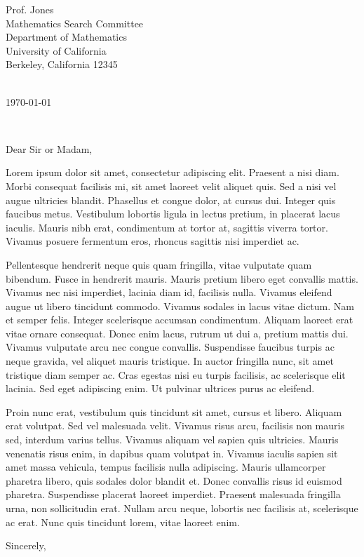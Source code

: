 \documentclass[11pt,a4paper]{letter} %
\def\opening#1{\thispagestyle{empty}
{\centering\fromaddress \vspace{0.6in} \\ %
\hspace*{\longindentation}\today\hspace*{\fill}\par} %
{\raggedright \toname \\ \toaddress \par} %
\vspace{0.4in} %
\noindent #1 %
}
\begin{document}

\begin{letter}
{Prof. Jones\\
Mathematics Search Committee\\
Department of Mathematics\\
University of California\\
Berkeley, California 12345\\
}


\opening{Dear Sir or Madam,}

Lorem ipsum dolor sit amet, consectetur adipiscing elit. Praesent a nisi diam. Morbi consequat facilisis mi, sit amet laoreet velit aliquet quis. Sed a nisi vel augue ultricies blandit. Phasellus et congue dolor, at cursus dui. Integer quis faucibus metus. Vestibulum lobortis ligula in lectus pretium, in placerat lacus iaculis. Mauris nibh erat, condimentum at tortor at, sagittis viverra tortor. Vivamus posuere fermentum eros, rhoncus sagittis nisi imperdiet ac.

Pellentesque hendrerit neque quis quam fringilla, vitae vulputate quam bibendum. Fusce in hendrerit mauris. Mauris pretium libero eget convallis mattis. Vivamus nec nisi imperdiet, lacinia diam id, facilisis nulla. Vivamus eleifend augue ut libero tincidunt commodo. Vivamus sodales in lacus vitae dictum. Nam et semper felis. Integer scelerisque accumsan condimentum. Aliquam laoreet erat vitae ornare consequat. Donec enim lacus, rutrum ut dui a, pretium mattis dui. Vivamus vulputate arcu nec congue convallis. Suspendisse faucibus turpis ac neque gravida, vel aliquet mauris tristique. In auctor fringilla nunc, sit amet tristique diam semper ac. Cras egestas nisi eu turpis facilisis, ac scelerisque elit lacinia. Sed eget adipiscing enim. Ut pulvinar ultrices purus ac eleifend.

Proin nunc erat, vestibulum quis tincidunt sit amet, cursus et libero. Aliquam erat volutpat. Sed vel malesuada velit. Vivamus risus arcu, facilisis non mauris sed, interdum varius tellus. Vivamus aliquam vel sapien quis ultricies. Mauris venenatis risus enim, in dapibus quam volutpat in. Vivamus iaculis sapien sit amet massa vehicula, tempus facilisis nulla adipiscing. Mauris ullamcorper pharetra libero, quis sodales dolor blandit et. Donec convallis risus id euismod pharetra. Suspendisse placerat laoreet imperdiet. Praesent malesuada fringilla urna, non sollicitudin erat. Nullam arcu neque, lobortis nec facilisis at, scelerisque ac erat. Nunc quis tincidunt lorem, vitae laoreet enim.

\closing{Sincerely,}


\end{letter}
\end{document}

